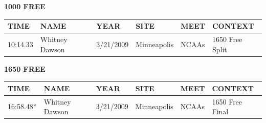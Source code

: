 \begin{table}[H]
\centering
\begin{minipage}[t]{0.48\textwidth}
\centering
\textbf{1000 FREE}\\[0.1cm]
\begin{tabular}{@{}p{1.8cm}p{2.8cm}p{1.2cm}p{1.4cm}p{1.4cm}p{2.0cm}@{}}
\hline
    \textbf{TIME} & \textbf{NAME} & \textbf{YEAR} & \textbf{SITE} & \textbf{MEET} & \textbf{CONTEXT} \\
\hline
    10:14.33 & Whitney Dawson & 3/21/2009 & Minneapolis & NCAAs & 1650 Free Split \\
\hline
\end{tabular}
\end{minipage}\hfill
\begin{minipage}[t]{0.48\textwidth}
\centering
\textbf{1650 FREE}\\[0.1cm]
\begin{tabular}{@{}p{1.8cm}p{2.8cm}p{1.2cm}p{1.4cm}p{1.4cm}p{2.0cm}@{}}
\hline
    \textbf{TIME} & \textbf{NAME} & \textbf{YEAR} & \textbf{SITE} & \textbf{MEET} & \textbf{CONTEXT} \\
\hline
    16:58.48* & Whitney Dawson & 3/21/2009 & Minneapolis & NCAAs & 1650 Free Final \\
\hline
\end{tabular}
\end{minipage}
\end{table}

